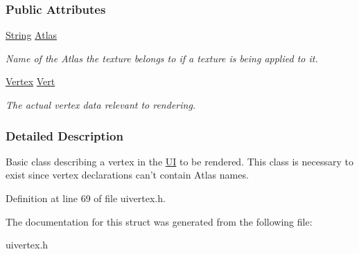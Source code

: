 \subsubsection*{Public Attributes}
\begin{DoxyCompactItemize}
\item 
\hypertarget{structMezzanine_1_1UI_1_1VertexData_abd0db8958c43a0df6987fef44b6f99b0}{
\hyperlink{namespaceMezzanine_acf9fcc130e6ebf08e3d8491aebcf1c86}{String} \hyperlink{structMezzanine_1_1UI_1_1VertexData_abd0db8958c43a0df6987fef44b6f99b0}{Atlas}}
\label{structMezzanine_1_1UI_1_1VertexData_abd0db8958c43a0df6987fef44b6f99b0}

\begin{DoxyCompactList}\small\item\em Name of the Atlas the texture belongs to if a texture is being applied to it. \item\end{DoxyCompactList}\item 
\hypertarget{structMezzanine_1_1UI_1_1VertexData_aba0c89686da51f19dbcd963fd165240b}{
\hyperlink{structMezzanine_1_1UI_1_1Vertex}{Vertex} \hyperlink{structMezzanine_1_1UI_1_1VertexData_aba0c89686da51f19dbcd963fd165240b}{Vert}}
\label{structMezzanine_1_1UI_1_1VertexData_aba0c89686da51f19dbcd963fd165240b}

\begin{DoxyCompactList}\small\item\em The actual vertex data relevant to rendering. \item\end{DoxyCompactList}\end{DoxyCompactItemize}


\subsubsection{Detailed Description}
Basic class describing a vertex in the \hyperlink{namespaceMezzanine_1_1UI}{UI} to be rendered. This class is necessary to exist since vertex declarations can't contain Atlas names. 

Definition at line 69 of file uivertex.h.



The documentation for this struct was generated from the following file:\begin{DoxyCompactItemize}
\item 
uivertex.h\end{DoxyCompactItemize}
